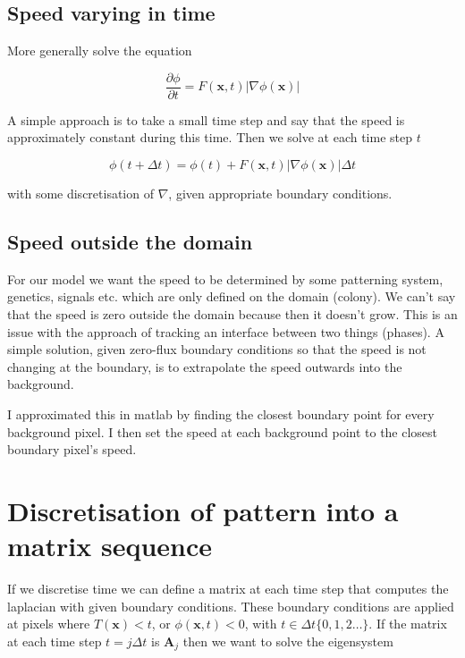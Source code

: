 \documentclass{report}
\renewcommand{\vec}[1]{\mathbf{#1}}
\newcommand{\mat}{\mathbf}
\begin{document}
\subsection{Speed varying in time}
More generally solve the equation

\begin{equation}
\frac{\partial \phi}{\partial t} = F(\vec{x},t)\left|\nabla\phi(\vec{x})\right|
\end{equation}

A simple approach is to take a small time step and say that the speed is
approximately constant during this time. Then we solve at each time step $t$

\begin{equation}
\phi(t+\Delta t) = \phi(t) + F(\vec{x},t) \left|\nabla\phi(\vec{x})\right| \Delta t 
\end{equation}

with some discretisation of $\nabla$, given appropriate boundary conditions.

\subsection{Speed outside the domain}
For our model we want the speed to be determined by some patterning system,
genetics, signals etc. which are only defined on the domain (colony). We can't
say that the speed is zero outside the domain because then it doesn't grow. This
is an issue with the approach of tracking an interface between two things
(phases). A simple solution, given zero-flux boundary conditions so that the
speed is not changing at the boundary, is to extrapolate the speed outwards into
the background.

I approximated this in matlab by finding the closest boundary point for every
background pixel. I then set the speed at each background point 
to the closest boundary pixel's speed.

\section{Discretisation of pattern into a matrix sequence}
If we discretise time we can define a matrix at each time step that computes the
laplacian with given boundary conditions. These boundary conditions are applied
at pixels where $T(\vec{x})<t$, or $\phi(\vec{x},t)<0$, with $t \in \Delta
t\{0,1,2\dots\}$. If the matrix at each time step $t=j\Delta t$ is $\mat{A}_j$
then we want to solve the eigensystem
\end{document}
